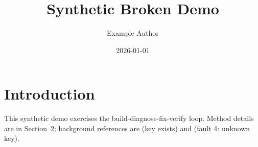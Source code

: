 \documentclass[11pt]{article}
\title{Synthetic Broken Demo}
\author{Example Author}
\date{2026-01-01}
\begin{document}
\maketitle
\section{Introduction}
This synthetic demo exercises the build-diagnose-fix-verify loop.
Method details are in Section~2; background references are
\cite{knuth1984} (key exists) and \cite{knuth1997} (fault 4: unknown key).



\end{document}
